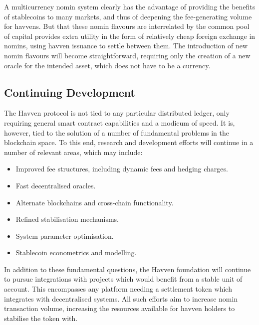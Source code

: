 \noindent A multicurrency nomin system clearly has the advantage of providing the
benefits of stablecoins to many markets, and thus of deepening
the fee-generating volume for havvens. But that these nomin flavours
are interrelated by the common pool of capital provides extra utility
in the form of relatively cheap foreign exchange in nomins, using 
havven issuance to settle between them.
The introduction of new nomin flavours will become straightforward,
requiring only the creation of a new oracle for the intended asset,
which does not have to be a currency. \\


\subsection{Continuing Development}

\noindent The Havven protocol is not tied to any particular distributed ledger,
only requiring general smart contract capabilities and a modicum of speed.
It is, however, tied to the solution of a number of fundamental problems
in the blockchain space. To this end, research and development efforts
will continue in a number of relevant areas, which may include:

\begin{itemize}
    \item Improved fee structures, including dynamic fees and hedging charges.
    \item Fast decentralised oracles.
    \item Alternate blockchains and cross-chain functionality.
    \item Refined stabilisation mechanisms.
    \item System parameter optimisation.
    \item Stablecoin econometrics and modelling.
\end{itemize}

\noindent In addition to these fundamental questions, the Havven foundation will continue
to pursue integrations with projects which would benefit from a stable unit of
account. This encompasses any platform needing a settlement token which
integrates with decentralised systems. All such efforts aim to increase nomin
transaction volume, increasing the resources available for havven holders to
stabilise the token with.
